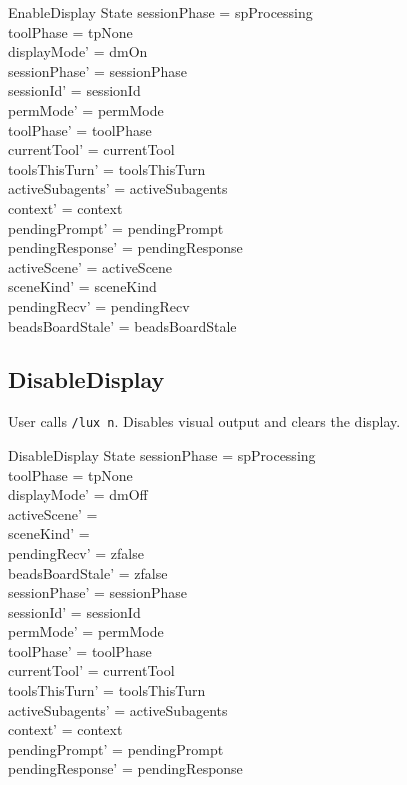 \documentclass[a4paper,10pt,fleqn]{article}
\begin{document}
\begin{schema}{EnableDisplay}
  \Delta State
  \where
  sessionPhase = spProcessing \\
  toolPhase = tpNone \\
  displayMode' = dmOn \\
  sessionPhase' = sessionPhase \\
  sessionId' = sessionId \\
  permMode' = permMode \\
  toolPhase' = toolPhase \\
  currentTool' = currentTool \\
  toolsThisTurn' = toolsThisTurn \\
  activeSubagents' = activeSubagents \\
  context' = context \\
  pendingPrompt' = pendingPrompt \\
  pendingResponse' = pendingResponse \\
  activeScene' = activeScene \\
  sceneKind' = sceneKind \\
  pendingRecv' = pendingRecv \\
  beadsBoardStale' = beadsBoardStale
\end{schema}

\subsection{DisableDisplay}

User calls \texttt{/lux n}. Disables visual output and clears
the display.

\begin{schema}{DisableDisplay}
  \Delta State
  \where
  sessionPhase = spProcessing \\
  toolPhase = tpNone \\
  displayMode' = dmOff \\
  activeScene' = \emptyset \\
  sceneKind' = \emptyset \\
  pendingRecv' = zfalse \\
  beadsBoardStale' = zfalse \\
  sessionPhase' = sessionPhase \\
  sessionId' = sessionId \\
  permMode' = permMode \\
  toolPhase' = toolPhase \\
  currentTool' = currentTool \\
  toolsThisTurn' = toolsThisTurn \\
  activeSubagents' = activeSubagents \\
  context' = context \\
  pendingPrompt' = pendingPrompt \\
  pendingResponse' = pendingResponse
\end{schema}
\end{document}

